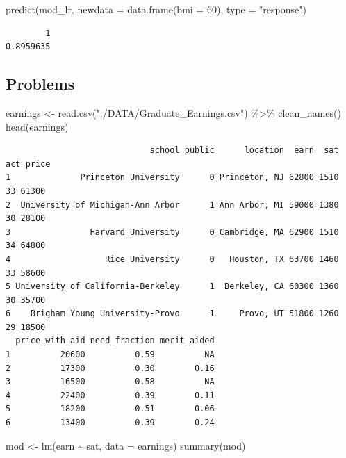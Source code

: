 \documentclass[
]{article}
\newenvironment{Shaded}{\begin{snugshade}}{\end{snugshade}}
\newcommand{\AttributeTok}[1]{\textcolor[rgb]{0.77,0.63,0.00}{#1}}
\newcommand{\DecValTok}[1]{\textcolor[rgb]{0.00,0.00,0.81}{#1}}
\newcommand{\FunctionTok}[1]{\textcolor[rgb]{0.00,0.00,0.00}{#1}}
\newcommand{\NormalTok}[1]{#1}
\newcommand{\OtherTok}[1]{\textcolor[rgb]{0.56,0.35,0.01}{#1}}
\newcommand{\SpecialCharTok}[1]{\textcolor[rgb]{0.00,0.00,0.00}{#1}}
\newcommand{\StringTok}[1]{\textcolor[rgb]{0.31,0.60,0.02}{#1}}
\begin{document}
\begin{Shaded}
\begin{Highlighting}[]
\FunctionTok{predict}\NormalTok{(mod\_lr, }\AttributeTok{newdata =} \FunctionTok{data.frame}\NormalTok{(}\AttributeTok{bmi =} \DecValTok{60}\NormalTok{), }\AttributeTok{type =} \StringTok{"response"}\NormalTok{)}
\end{Highlighting}
\end{Shaded}

\begin{verbatim}
        1 
0.8959635 
\end{verbatim}

\hypertarget{problems}{%
\subsection{Problems}\label{problems}}

\begin{Shaded}
\begin{Highlighting}[]
\NormalTok{earnings }\OtherTok{\textless{}{-}} \FunctionTok{read.csv}\NormalTok{(}\StringTok{"./DATA/Graduate\_Earnings.csv"}\NormalTok{) }\SpecialCharTok{\%\textgreater{}\%} 
  \FunctionTok{clean\_names}\NormalTok{()}
\FunctionTok{head}\NormalTok{(earnings)}
\end{Highlighting}
\end{Shaded}

\begin{verbatim}
                             school public      location  earn  sat act price
1              Princeton University      0 Princeton, NJ 62800 1510  33 61300
2  University of Michigan-Ann Arbor      1 Ann Arbor, MI 59000 1380  30 28100
3                Harvard University      0 Cambridge, MA 62900 1510  34 64800
4                   Rice University      0   Houston, TX 63700 1460  33 58600
5 University of California-Berkeley      1  Berkeley, CA 60300 1360  30 35700
6    Brigham Young University-Provo      1     Provo, UT 51800 1260  29 18500
  price_with_aid need_fraction merit_aided
1          20600          0.59          NA
2          17300          0.30        0.16
3          16500          0.58          NA
4          22400          0.39        0.11
5          18200          0.51        0.06
6          13400          0.39        0.24
\end{verbatim}

\begin{Shaded}
\begin{Highlighting}[]
\NormalTok{mod }\OtherTok{\textless{}{-}} \FunctionTok{lm}\NormalTok{(earn }\SpecialCharTok{\textasciitilde{}}\NormalTok{ sat, }\AttributeTok{data =}\NormalTok{ earnings)}
\FunctionTok{summary}\NormalTok{(mod)}
\end{Highlighting}
\end{Shaded}
\end{document}
